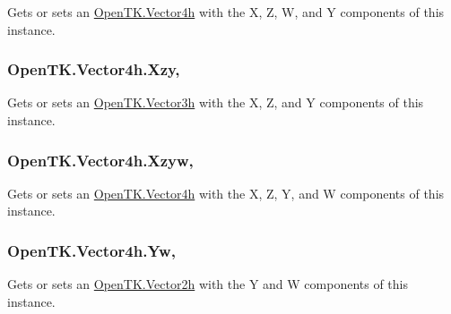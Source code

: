 Gets or sets an \hyperlink{struct_open_t_k_1_1_vector4h}{Open\-T\-K.\-Vector4h} with the X, Z, W, and Y components of this instance. 

\hypertarget{struct_open_t_k_1_1_vector4h_a36238fc35085e4ce28a17085365ac5dc}{
\subsubsection[{Xzy}]{ Open\-T\-K.\-Vector4h.\-Xzy\hspace{0.3cm}{\ttfamily [get]}, {\ttfamily [set]}}}\label{struct_open_t_k_1_1_vector4h_a36238fc35085e4ce28a17085365ac5dc}


Gets or sets an \hyperlink{struct_open_t_k_1_1_vector3h}{Open\-T\-K.\-Vector3h} with the X, Z, and Y components of this instance. 

\hypertarget{struct_open_t_k_1_1_vector4h_a51c923d27671819c6894e0f93e6e4c82}{
\subsubsection[{Xzyw}]{ Open\-T\-K.\-Vector4h.\-Xzyw\hspace{0.3cm}{\ttfamily [get]}, {\ttfamily [set]}}}\label{struct_open_t_k_1_1_vector4h_a51c923d27671819c6894e0f93e6e4c82}


Gets or sets an \hyperlink{struct_open_t_k_1_1_vector4h}{Open\-T\-K.\-Vector4h} with the X, Z, Y, and W components of this instance. 

\hypertarget{struct_open_t_k_1_1_vector4h_a529350961d98235eedb221afc88a775b}{
\subsubsection[{Yw}]{ Open\-T\-K.\-Vector4h.\-Yw\hspace{0.3cm}{\ttfamily [get]}, {\ttfamily [set]}}}\label{struct_open_t_k_1_1_vector4h_a529350961d98235eedb221afc88a775b}


Gets or sets an \hyperlink{struct_open_t_k_1_1_vector2h}{Open\-T\-K.\-Vector2h} with the Y and W components of this instance. 

